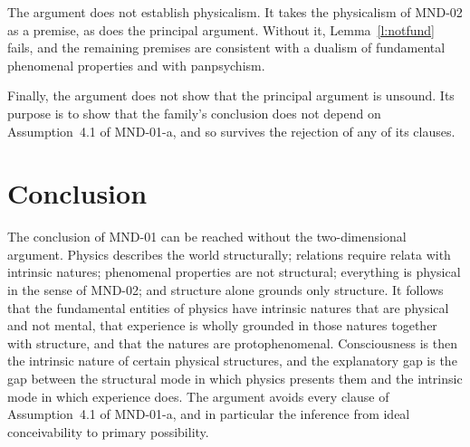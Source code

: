 \documentclass{situationist-preprint}
\begin{document}
The argument does not establish physicalism. It takes the physicalism of MND-02 as a premise, as does the principal argument. Without it, Lemma~\ref{l:notfund} fails, and the remaining premises are consistent with a dualism of fundamental phenomenal properties and with panpsychism.

Finally, the argument does not show that the principal argument is unsound. Its purpose is to show that the family's conclusion does not depend on Assumption~4.1 of MND-01-a, and so survives the rejection of any of its clauses.

\section{Conclusion}\label{s:concl}

The conclusion of MND-01 can be reached without the two-dimensional argument. Physics describes the world structurally; relations require relata with intrinsic natures; phenomenal properties are not structural; everything is physical in the sense of MND-02; and structure alone grounds only structure. It follows that the fundamental entities of physics have intrinsic natures that are physical and not mental, that experience is wholly grounded in those natures together with structure, and that the natures are protophenomenal. Consciousness is then the intrinsic nature of certain physical structures, and the explanatory gap is the gap between the structural mode in which physics presents them and the intrinsic mode in which experience does. The argument avoids every clause of Assumption~4.1 of MND-01-a, and in particular the inference from ideal conceivability to primary possibility.
\end{document}
